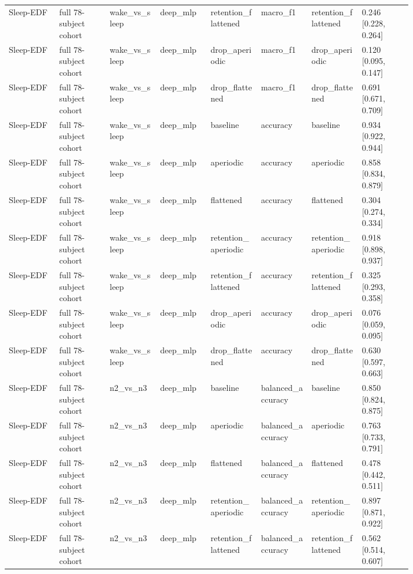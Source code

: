 \begin{longtable}{p{0.10\linewidth}p{0.10\linewidth}p{0.10\linewidth}p{0.10\linewidth}p{0.10\linewidth}p{0.10\linewidth}p{0.10\linewidth}p{0.10\linewidth}}
Sleep-EDF & full 78-subject cohort & wake\_vs\_sleep & deep\_mlp & retention\_flattened & macro\_f1 & retention\_flattened & 0.246 [0.228, 0.264]\\
Sleep-EDF & full 78-subject cohort & wake\_vs\_sleep & deep\_mlp & drop\_aperiodic & macro\_f1 & drop\_aperiodic & 0.120 [0.095, 0.147]\\
Sleep-EDF & full 78-subject cohort & wake\_vs\_sleep & deep\_mlp & drop\_flattened & macro\_f1 & drop\_flattened & 0.691 [0.671, 0.709]\\
Sleep-EDF & full 78-subject cohort & wake\_vs\_sleep & deep\_mlp & baseline & accuracy & baseline & 0.934 [0.922, 0.944]\\
Sleep-EDF & full 78-subject cohort & wake\_vs\_sleep & deep\_mlp & aperiodic & accuracy & aperiodic & 0.858 [0.834, 0.879]\\
Sleep-EDF & full 78-subject cohort & wake\_vs\_sleep & deep\_mlp & flattened & accuracy & flattened & 0.304 [0.274, 0.334]\\
Sleep-EDF & full 78-subject cohort & wake\_vs\_sleep & deep\_mlp & retention\_aperiodic & accuracy & retention\_aperiodic & 0.918 [0.898, 0.937]\\
Sleep-EDF & full 78-subject cohort & wake\_vs\_sleep & deep\_mlp & retention\_flattened & accuracy & retention\_flattened & 0.325 [0.293, 0.358]\\
Sleep-EDF & full 78-subject cohort & wake\_vs\_sleep & deep\_mlp & drop\_aperiodic & accuracy & drop\_aperiodic & 0.076 [0.059, 0.095]\\
Sleep-EDF & full 78-subject cohort & wake\_vs\_sleep & deep\_mlp & drop\_flattened & accuracy & drop\_flattened & 0.630 [0.597, 0.663]\\
Sleep-EDF & full 78-subject cohort & n2\_vs\_n3 & deep\_mlp & baseline & balanced\_accuracy & baseline & 0.850 [0.824, 0.875]\\
Sleep-EDF & full 78-subject cohort & n2\_vs\_n3 & deep\_mlp & aperiodic & balanced\_accuracy & aperiodic & 0.763 [0.733, 0.791]\\
Sleep-EDF & full 78-subject cohort & n2\_vs\_n3 & deep\_mlp & flattened & balanced\_accuracy & flattened & 0.478 [0.442, 0.511]\\
Sleep-EDF & full 78-subject cohort & n2\_vs\_n3 & deep\_mlp & retention\_aperiodic & balanced\_accuracy & retention\_aperiodic & 0.897 [0.871, 0.922]\\
Sleep-EDF & full 78-subject cohort & n2\_vs\_n3 & deep\_mlp & retention\_flattened & balanced\_accuracy & retention\_flattened & 0.562 [0.514, 0.607]\\

\end{longtable}
